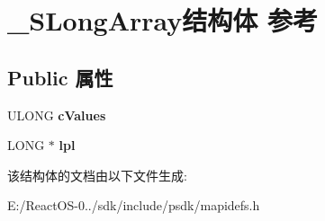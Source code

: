 \hypertarget{struct___s_long_array}{}\section{\+\_\+\+S\+Long\+Array结构体 参考}
\label{struct___s_long_array}
\subsection*{Public 属性}
\begin{DoxyCompactItemize}
\item 
\mbox{\label{struct___s_long_array_a606533e87b0bf71b207a27ff370ab3eb}} 
U\+L\+O\+NG {\bfseries c\+Values}
\item 
\mbox{\label{struct___s_long_array_a80ad61e0a6758f037fb2dd7731fd6526}} 
L\+O\+NG $\ast$ {\bfseries lpl}
\end{DoxyCompactItemize}


该结构体的文档由以下文件生成\+:\begin{DoxyCompactItemize}
\item 
E\+:/\+React\+O\+S-\/0../sdk/include/psdk/mapidefs.\+h\end{DoxyCompactItemize}
